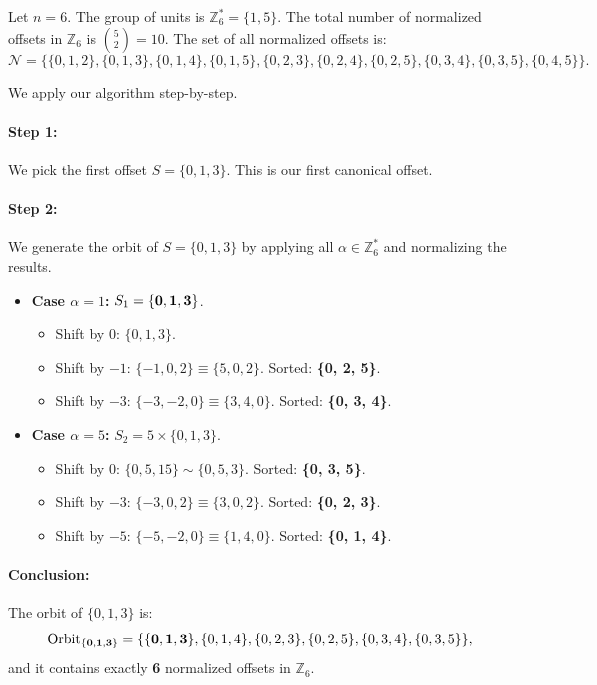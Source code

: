 \documentclass[12pt,letterpaper]{amsart}
\begin{document}
Let $n=6$. The group of units is $\mathbb{Z}_6^* = \{1, 5\}$.
The total number of normalized offsets in $\mathbb{Z}_6$ is $\binom{5}{2} = 10$. The set of all normalized offsets is:
\[ \mathcal{N} = \big\{ \{0,1,2\}, \{0,1,3\}, \{0,1,4\}, \{0,1,5\}, \{0,2,3\}, \{0,2,4\}, \{0,2,5\}, \{0,3,4\}, \{0,3,5\}, \{0,4,5\} \big\}. \]

We apply our algorithm step-by-step.

\paragraph{Step 1:} We pick the first offset $S = \{0, 1, 3\}$. This is our first canonical offset.

\paragraph{Step 2:} We generate the orbit of $S=\{0,1,3\}$ by applying all $\alpha \in \mathbb{Z}_6^*$ and normalizing the results.

\begin{itemize}
    \item \textbf{Case $\alpha = 1$:} $S_1 = {\bf \{0, 1, 3\}}$.
    \begin{itemize}
        \item Shift by 0: $\{0, 1, 3\}$.
        \item Shift by $-1$: $\{ -1, 0, 2 \} \equiv \{5, 0, 2\}$. Sorted: \textbf{\{0, 2, 5\}}.
        \item Shift by $-3$: $\{ -3, -2, 0 \} \equiv \{3, 4, 0\}$. Sorted: \textbf{\{0, 3, 4\}}.
    \end{itemize}
    
    \item \textbf{Case $\alpha = 5$:} $S_2 = 5\times \{0, 1, 3\}$.
    \begin{itemize}
        \item Shift by 0: $\{0, 5, 15\}\sim \{0,5,3\}$. Sorted: \textbf{\{0, 3, 5\}}.
        \item Shift by $-3$: $\{ -3, 0, 2 \} \equiv \{3, 0, 2\}$. Sorted: \textbf{\{0, 2, 3\}}.
        \item Shift by $-5$: $\{ -5, -2, 0 \} \equiv \{1, 4, 0\}$. Sorted: \textbf{\{0, 1, 4\}}.
    \end{itemize}
\end{itemize}

\paragraph{Conclusion:} 
The orbit of $\{0,1,3\}$ is:
\[ \text{Orbit}_{{\bf \{0,1,3\}}} = \{ {\bf \{0,1,3\}}, \{0,1,4\}, \{0,2,3\}, \{0,2,5\}, \{0,3,4\}, \{0,3,5\} \}, \]
and it contains exactly \textbf{6} normalized offsets in $\mathbb{Z}_6$.
\end{document}
